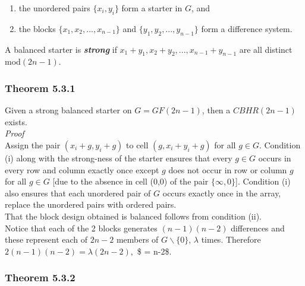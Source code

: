 \documentclass[
  12pt,
  a4paper]{book}
\begin{document}
\begin{enumerate}
\def\labelenumi{\arabic{enumi}.}
\item
  the unordered pairs \(\{x_i,y_i\}\) form a starter in \(G\), and
\item
  the blocks \(\{x_1,x_2,...,x_{n-1}\}\) and \(\{y_1,y_2,...,y_{n-1}\}\)
  form a difference system.
\end{enumerate}

A balanced starter is \textbf{\emph{strong}} if
\(x_1+y_1,x_2+y_2,...,x_{n-1}+y_{n-1}\) are all distinct mod\((2n-1)\).

\hypertarget{theorem-5.3.1}{%
\subsubsection{Theorem 5.3.1}\label{theorem-5.3.1}}

Given a strong balanced starter on \(G=GF(2n-1)\), then a \(CBHR(2n-1)\)
exists.\\
\emph{Proof}\\
Assign the pair \((x_i+g,y_i+g)\) to cell \((g,x_i+y_i+g)\) for all
\(g \in G\). Condition (i) along with the strong-ness of the starter
ensures that every \(g \in G\) occurs in every row and column exactly once
except \(g\) does not occur in row or column \(g\) for all \(g \in G\) {[}due to
the absence in cell (0,0) of the pair \(\{\infty,0\}\){]}. Condition (i)
also ensures that each unordered pair of \(G\) occurs exactly once in the
array, replace the unordered pairs with ordered pairs.\\
That the block design obtained is balanced follows from condition (ii).\\
Notice that each of the 2 blocks generates \((n-1)(n-2)\) differences and
these represent each of \(2n-2\) members of \(G \backslash \{0\}\),
\(\lambda\) times. Therefore \(2(n-1)(n-2) = \lambda (2n-2),\)
\$ \Rightarrow \lambda = n-2\$.

\hypertarget{theorem-5.3.2}{%
\subsubsection{Theorem 5.3.2}\label{theorem-5.3.2}}
\end{document}
